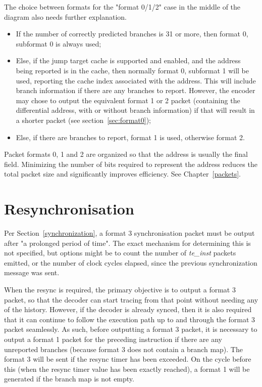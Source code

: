 The choice between formats for the "format 0/1/2" case in the middle of the diagram also needs further 
explanation.  

\begin{itemize}
  \item If the number of correctly predicted branches is 31 or more, then format 0, subformat 0 is
    always used;
  \item Else, if the jump target cache is supported and enabled, and the address being reported is in the cache,
    then normally format 0, subformat 1 will be used, reporting the cache index associated with the address.  
    This will include branch information if there are any branches to report.  
    However, the encoder may chose to output the equivalent format 1 or 2 packet (containing the differential 
    address, with or without branch information) if that will result in a shorter packet 
    (see section~\ref{sec:format0});
  \item Else, if there are branches to report, format 1 is used, otherwise format 2.
\end{itemize}


Packet formats 0, 1 and 2 are organized so that the address is usually the final field.  Minimizing the 
number of bits required to represent the address reduces the total packet size and significantly
improves efficiency.  See Chapter~\ref{packets}.

\section{Resynchronisation} \label{sec:resync}

Per Section~\ref{synchronization}, a format 3 synchronisation packet must be output after "a prolonged
period of time". The exact mechanism for
determining this is not specified, but options might be to count the number of \textit{te\_inst} packets emitted, 
or the number of clock cycles elapsed, since the previous synchronization message was sent.

When the resync is required, the primary objective is to output a format 3 packet, so that the decoder can 
start tracing from that point without needing any of the history.  However, if the decoder is already synced, 
then it is also required that it can continue to follow the execution path up to and through the format 3 packet 
seamlessly.  As such, before outputting a format 3 packet, it is necessary to output a format 1 packet for the 
preceding instruction if there are any unreported branches (because format 3 does not contain a branch map).  
The format 3 will be sent if the resync timer has been exceeded.  On the cycle before this (when the resync timer 
value has been exactly reached), a format 1 will be generated if the branch map is not empty.

